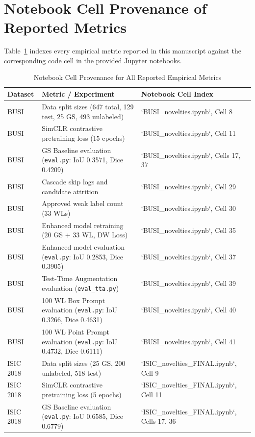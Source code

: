 \documentclass[journal,11pt,onecolumn,draftclsnofoot]{IEEEtran}
\begin{document}
\section{Notebook Cell Provenance of Reported Metrics}
\label{app:provenance}
Table~\ref{tab:provenance} indexes every empirical metric reported in this manuscript against the corresponding code cell in the provided Jupyter notebooks.

\begin{table}[h]
\renewcommand{\arraystretch}{1.15}
\caption{Notebook Cell Provenance for All Reported Empirical Metrics}
\label{tab:provenance}
\centering\footnotesize
\begin{tabular}{@{}llp{6.8cm}@{}}
\toprule
Dataset & Metric / Experiment & Notebook Cell Index \\
\midrule
BUSI & Data split sizes (647 total, 129 test, 25 GS, 493 unlabeled) & `BUSI_novelties.ipynb`, Cell 8 \\
BUSI & SimCLR contrastive pretraining loss (15 epochs) & `BUSI_novelties.ipynb`, Cell 11 \\
BUSI & GS Baseline evaluation (\texttt{eval.py}: IoU 0.3571, Dice 0.4209) & `BUSI_novelties.ipynb`, Cells 17, 37 \\
BUSI & Cascade skip logs and candidate attrition & `BUSI_novelties.ipynb`, Cell 29 \\
BUSI & Approved weak label count (33 WLs) & `BUSI_novelties.ipynb`, Cell 30 \\
BUSI & Enhanced model retraining (20 GS + 33 WL, DW Loss) & `BUSI_novelties.ipynb`, Cell 35 \\
BUSI & Enhanced model evaluation (\texttt{eval.py}: IoU 0.2853, Dice 0.3905) & `BUSI_novelties.ipynb`, Cell 37 \\
BUSI & Test-Time Augmentation evaluation (\texttt{eval\_tta.py}) & `BUSI_novelties.ipynb`, Cell 39 \\
BUSI & 100 WL Box Prompt evaluation (\texttt{eval.py}: IoU 0.3266, Dice 0.4631) & `BUSI_novelties.ipynb`, Cell 40 \\
BUSI & 100 WL Point Prompt evaluation (\texttt{eval.py}: IoU 0.4732, Dice 0.6111) & `BUSI_novelties.ipynb`, Cell 41 \\
\midrule
ISIC 2018 & Data split sizes (25 GS, 200 unlabeled, 518 test) & `ISIC_novelties_FINAL.ipynb`, Cell 9 \\
ISIC 2018 & SimCLR contrastive pretraining loss (5 epochs) & `ISIC_novelties_FINAL.ipynb`, Cell 11 \\
ISIC 2018 & GS Baseline evaluation (\texttt{eval.py}: IoU 0.6585, Dice 0.6779) & `ISIC_novelties_FINAL.ipynb`, Cells 17, 36 \\

\end{tabular}
\end{table}
\end{document}
